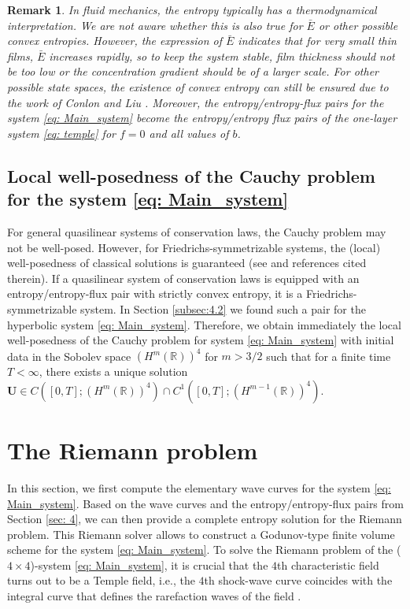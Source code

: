 \documentclass[11pt]{article}
\numberwithin{equation}{section}
\newtheorem{counter example}[theorem]{Counter Example}
\newtheorem{remark}[theorem] {Remark}
\begin{document}
{\begin{remark}
In fluid mechanics, the entropy typically has a thermodynamical interpretation. We are not aware whether this is also true for $\bar E$ or other possible convex entropies. However, the expression of $\bar E$ indicates that for very small thin films, $\bar E$ increases rapidly, so to keep the system stable, film thickness should not be too low or the concentration gradient should be of a larger scale. For other possible state spaces, the existence of convex entropy can still be ensured due to the work of Conlon and Liu \cite{conlon1981admissibility}. Moreover, the entropy/entropy-flux pairs for the system \eqref{eq: Main_system} become the entropy/entropy flux pairs of the one-layer system \eqref{eq: temple} for $f=0$ and all values of $b$.
\end{remark}
\subsection{Local well-posedness of the Cauchy problem for the system \eqref{eq: Main_system}}
For general quasilinear systems of conservation laws, the Cauchy problem may not be well-posed. However, for Friedrichs-symmetrizable systems, the (local)  well-posedness of classical solutions is guaranteed (see \cite{dafermos2005hyperbolic, MR390516, majda2012compressible, serre1999systems} and references cited therein). If a quasilinear system of conservation laws is equipped with an entropy/entropy-flux pair with strictly convex entropy, it is a Friedrichs-symmetrizable system. In Section \ref{subsec:4.2} we found such a pair for the hyperbolic system \eqref{eq: Main_system}. Therefore, we obtain immediately the local well-posedness of the Cauchy problem for system \eqref{eq: Main_system} with initial data in the Sobolev space $(H^m(\mathbb{R}))^4$ for $m>3/2$ such that for a finite time $T<\infty$, there exists a unique solution $\mathbf{U}\in C([0, T]; (H^m(\mathbb{R}))^4)\cap C^1([0, T]; (H^{m-1}(\mathbb{R}))^4)$. 
\section{The Riemann problem}\label{sec: 5}
In this section, we first compute the elementary wave curves for the system \eqref{eq: Main_system}. Based on the wave curves and the entropy/entropy-flux pairs from Section  \ref{sec: 4}, we can then provide a complete entropy solution for the Riemann problem. This Riemann solver allows to construct a Godunov-type finite volume scheme for the system \eqref{eq: Main_system}. To solve the Riemann problem of the ($4\times4$)-system  \eqref{eq: Main_system}, it is crucial that the $4$th characteristic field
turns out to be a Temple field, i.e., the $4$th  shock-wave curve coincides with the integral curve that defines the rarefaction waves of the field \cite{temple1983systems}. 
}
\end{document}
